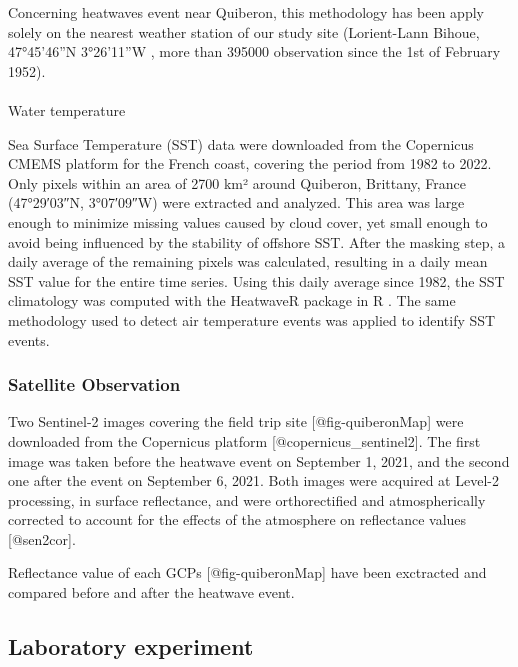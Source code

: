 \documentclass[
  number]{elsarticle}
\makeatletter
\let\oldparagraph\paragraph
\renewcommand{\paragraph}{
    \@ifstar
      \xxxParagraphStar
      \xxxParagraphNoStar
  }
\newcommand{\xxxParagraphStar}[1]{\oldparagraph*{#1}\mbox{}}
\newcommand{\xxxParagraphNoStar}[1]{\oldparagraph{#1}\mbox{}}
\makeatother
\begin{document}
Concerning heatwaves event near Quiberon, this methodology has been
apply solely on the nearest weather station of our study site
(Lorient-Lann Bihoue, 47°45'46''N 3°26'11''W , more than 395000
observation since the 1st of February 1952).

\paragraph{Water temperature}\label{water-temperature}

Sea Surface Temperature (SST) data were downloaded from the Copernicus
CMEMS platform \citep{CMEMS_1} for the French coast, covering the period
from 1982 to 2022. Only pixels within an area of 2700 km² around
Quiberon, Brittany, France (47°29′03″N, 3°07′09″W) were extracted and
analyzed. This area was large enough to minimize missing values caused
by cloud cover, yet small enough to avoid being influenced by the
stability of offshore SST. After the masking step, a daily average of
the remaining pixels was calculated, resulting in a daily mean SST value
for the entire time series. Using this daily average since 1982, the SST
climatology was computed with the HeatwaveR package in R
\citep{heatwaveR}. The same methodology used to detect air temperature
events was applied to identify SST events.

\subsubsection{Satellite Observation}\label{satellite-observation}

Two Sentinel-2 images covering the field trip site
{[}@fig-quiberonMap{]} were downloaded from the Copernicus platform
{[}@copernicus\_sentinel2{]}. The first image was taken before the
heatwave event on September 1, 2021, and the second one after the event
on September 6, 2021. Both images were acquired at Level-2 processing,
in surface reflectance, and were orthorectified and atmospherically
corrected to account for the effects of the atmosphere on reflectance
values {[}@sen2cor{]}.~

Reflectance value of each GCPs {[}@fig-quiberonMap{]} have been
exctracted and compared before and after the heatwave event.

\subsection{Laboratory experiment}\label{laboratory-experiment}
\end{document}
